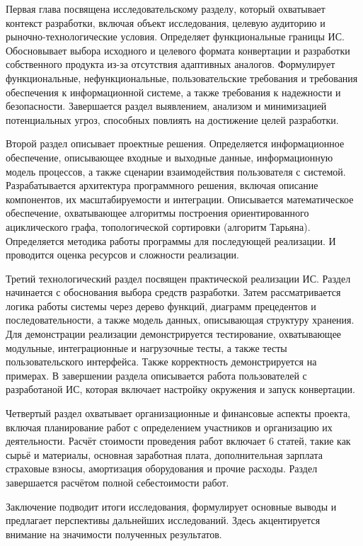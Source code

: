 Первая глава посвящена исследовательскому разделу,
который охватывает контекст разработки,
включая объект исследования, целевую аудиторию
и рыночно-технологические условия.
Определяет функциональные границы ИС.
Обосновывает выбора исходного и целевого формата конвертации
и разработки собственного продукта из-за отсутствия адаптивных аналогов.
Формулирует функциональные, нефункциональные, пользовательские требования
и требования обеспечения к информационной системе,
а также требования к надежности и безопасности.
Завершается раздел выявлением, анализом и минимизацией
потенциальных угроз, способных повлиять на достижение целей разработки.

Второй раздел описывает проектные решения.
Определяется информационное обеспечение, описывающее входные и выходные данные,
информационную модель процессов,
а также сценарии взаимодействия пользователя с системой.
Разрабатывается архитектура программного решения,
включая описание компонентов, их масштабируемости и интеграции.
Описывается математическое обеспечение, охватывающее алгоритмы
построения ориентированного ациклического графа,
топологической сортировки (алгоритм Тарьяна).
Определяется методика работы программы для последующей реализации.
И проводится оценка ресурсов и сложности реализации.

Третий технологический раздел посвящен практической реализации ИС.
Раздел начинается с обоснования выбора средств разработки.
Затем рассматривается логика работы системы через дерево функций,
диаграмм прецедентов и последовательности,
а также модель данных, описывающая структуру хранения.
Для демонстрации реализации демонстрируется тестирование, охватывающее
модульные, интеграционные и нагрузочные тесты,
а также тесты пользовательского интерфейса.
Также корректность демонстрируется на примерах.
В завершении раздела описывается работа пользователей с разработаной ИС,
которая включает настройку окружения и запуск конвертации.

Четвертый раздел охватывает организационные и финансовые аспекты проекта,
включая планирование работ с определением участников
и организацию их деятельности.
Расчёт стоимости проведения работ включает 6 статей, такие как
сырьё и материалы, основная заработная плата,
дополнительная зарплата страховые взносы,
амортизация оборудования и прочие расходы.
Раздел завершается расчётом полной себестоимости работ.

Заключение подводит итоги исследования,
формулирует основные выводы и предлагает перспективы дальнейших исследований.
Здесь акцентируется внимание на значимости полученных результатов.

